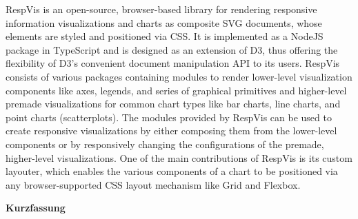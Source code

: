RespVis is an open-source, browser-based library for rendering
responsive information visualizations and charts as composite SVG
documents, whose elements are styled and positioned via CSS. It is
implemented as a NodeJS package in TypeScript and is designed as an
extension of D3, thus offering the flexibility of D3's convenient
document manipulation API to its users. RespVis consists of various
packages containing modules to render lower-level visualization
components like axes, legends, and series of graphical primitives and
higher-level premade visualizations for common chart types like bar
charts, line charts, and point charts (scatterplots). The modules
provided by RespVis can be used to create responsive visualizations by
either composing them from the lower-level components or by
responsively changing the configurations of the premade, higher-level
visualizations. One of the main contributions of RespVis is its custom
layouter, which enables the various components of a chart to be
positioned via any browser-supported CSS layout mechanism like Grid
and Flexbox.






\cleardoublepage

\vspace*{2cm}


\begin{otherlanguage}{austrian}

    \begin{center}
        {\Large\sffamily\bfseries Kurzfassung}
    \end{center}



\end{otherlanguage}




